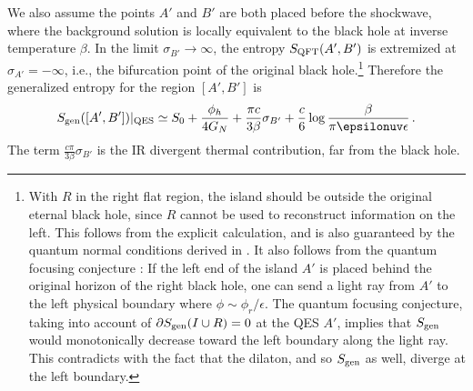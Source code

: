 \documentclass[11pt,oneside,letterpaper]{article}
\newcommand{\f}{\frac}
\newcommand{\ra}{\rangle}
\let\sg=\sigma \let\t=\tau \let\u=\upsilon \let\c=\chi
\let\f=\frac
\def\ba{\begin{eqnarray}}
\def\ea{\end{eqnarray}}
\numberwithin{equation}{section}
\def\ep{{\epsilon}}
\def\t{{\theta}}
\def\sg{{\sigma}}
\def\pp{\partial}
\def\ba{\begin{eqnarray}}
\def\ea{\end{eqnarray}}
\def\f {\frac}
\def\ep{\epsilon}
\def\ra{\rightarrow}
\begin{document}
\begin{spacing}{1.1}
We also assume the points $A'$ and $B'$ are both placed before the shockwave, where the background solution is locally equivalent to the black hole at inverse temperature $\beta$.  In the limit $\sg_{B'}\ra\infty$, the entropy $S_{\rm QFT}(A',B')$ is extremized at $\sg_{A'}=-\infty$, i.e., the bifurcation point of the original black hole.\footnote{With $R$ in the right flat region, the island should be outside the original eternal black hole, since $R$ cannot be used to reconstruct information on the left. This follows from the explicit calculation, and is also guaranteed by the quantum normal conditions derived in \cite{Almheiri:2019psf,Hartman:2020khs}. It also follows from the quantum focusing conjecture \cite{Almheiri:2019yqk}: If the left end of the island $A'$ is placed behind the original horizon of the right black hole, one can send a light ray from $A'$ to the left physical boundary where $\phi\sim\phi_r/\ep$. The quantum focusing conjecture, taking into account of $\pp S_{\rm gen}(I \cup R)=0$ at the QES $A'$,  implies that $S_{\rm gen}$ would monotonically decrease toward the left boundary along the light ray. This contradicts with the fact that the dilaton, and so $S_{\rm gen}$ as well, diverge at the left boundary.} Therefore the generalized entropy for the region $[A',B']$ is
 \ba
S_{\rm gen}([A',B'])|_{\rm QES}\simeq S_0+\f{\phi_h}{4G_N}%
 + \frac{\pi c}{3\beta}\sigma_{B'} + \frac{c}{6}\log \frac{\beta}{\pi\epsilonuv\ep}\, .
\ea
The term $\f{c\pi}{3\beta}\sg_{B'}$ is the IR divergent thermal contribution, far from the black hole.



\end{spacing}
\end{document}
